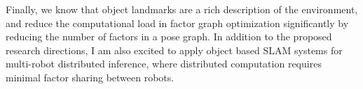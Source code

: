 Finally, we know that object landmarks are a rich description of the environment, and reduce the computational load in factor graph optimization significantly by reducing the number of factors in a pose graph. In addition to the proposed research directions, I am also excited to apply object based SLAM systems for multi-robot distributed inference, where distributed computation requires minimal factor sharing between robots.
